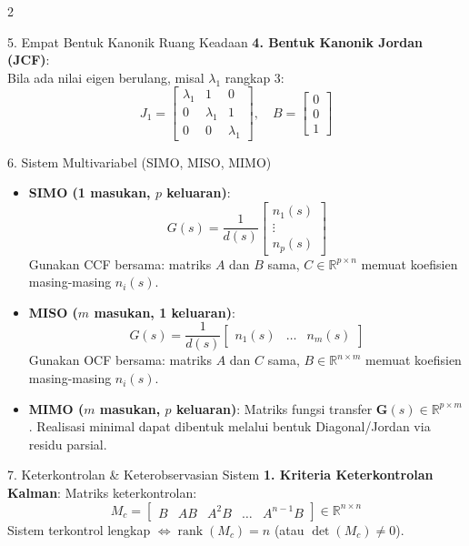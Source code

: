\documentclass[10pt,a4paper]{article}
\begin{document}
\begin{multicols*}{2}
\begin{rumusbox}{5. Empat Bentuk Kanonik Ruang Keadaan}
\textbf{4. Bentuk Kanonik Jordan (JCF)}:\\
Bila ada nilai eigen berulang, misal $\lambda_1$ rangkap 3:
{\scriptsize
$$J_1 = \begin{bmatrix} \lambda_1 & 1 & 0 \\ 0 & \lambda_1 & 1 \\ 0 & 0 & \lambda_1 \end{bmatrix}, \quad B = \begin{bmatrix} 0 \\ 0 \\ 1 \end{bmatrix}$$
}
\end{rumusbox}

\begin{rumusbox}{6. Sistem Multivariabel (SIMO, MISO, MIMO)}
\begin{itemize}\setlength\itemsep{1pt}
    \item \textbf{SIMO (1 masukan, $p$ keluaran)}:
    $$G(s) = \frac{1}{d(s)} \begin{bmatrix} n_1(s) \\ \vdots \\ n_p(s) \end{bmatrix}$$
    Gunakan CCF bersama: matriks $A$ dan $B$ sama, $C \in \mathbb{R}^{p \times n}$ memuat koefisien masing-masing $n_i(s)$.
    \item \textbf{MISO ($m$ masukan, 1 keluaran)}:
    $$G(s) = \frac{1}{d(s)} \begin{bmatrix} n_1(s) & \dots & n_m(s) \end{bmatrix}$$
    Gunakan OCF bersama: matriks $A$ dan $C$ sama, $B \in \mathbb{R}^{n \times m}$ memuat koefisien masing-masing $n_i(s)$.
    \item \textbf{MIMO ($m$ masukan, $p$ keluaran)}:
    Matriks fungsi transfer $\mathbf{G}(s) \in \mathbb{R}^{p \times m}$. Realisasi minimal dapat dibentuk melalui bentuk Diagonal/Jordan via residu parsial.
\end{itemize}
\end{rumusbox}

\begin{rumusbox}{7. Keterkontrolan \& Keterobservasian Sistem}
\textbf{1. Kriteria Keterkontrolan Kalman}:
Matriks keterkontrolan:
$$M_c = \begin{bmatrix} B & AB & A^2B & \dots & A^{n-1}B \end{bmatrix} \in \mathbb{R}^{n \times n}$$
Sistem terkontrol lengkap $\iff \operatorname{rank}(M_c) = n$ (atau $\det(M_c) \ne 0$).


\end{rumusbox}
\end{multicols*}
\end{document}
